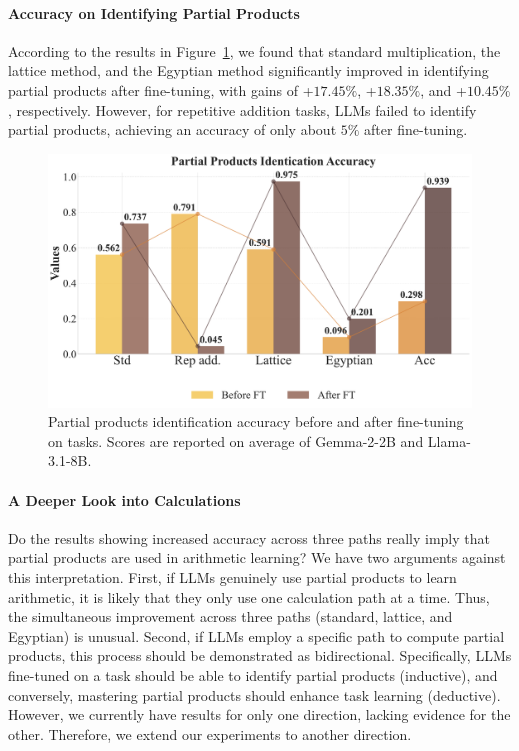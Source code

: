 \documentclass[11pt]{article}
\begin{document}
\paragraph{Accuracy on Identifying Partial Products}
According to the results in Figure~\ref{fig:partial_products}, we found that standard multiplication, the lattice method, and the Egyptian method significantly improved in identifying partial products after fine-tuning, with gains of +$17.45\%$, +$18.35\%$, and +$10.45\%$, respectively. However, for repetitive addition tasks, LLMs failed to identify partial products, achieving an accuracy of only about $5\%$ after fine-tuning.
\begin{figure}[ht]
    \centering
    \includegraphics[width=0.98\linewidth]{figure/metriC_comparison_new.pdf}
    \caption{Partial products identification accuracy before and after fine-tuning on tasks. Scores are reported on average of Gemma-2-2B and Llama-3.1-8B.}\label{fig:partial_products}
    \vspace{-0.4cm}
\end{figure}
\paragraph{A Deeper Look into Calculations}
Do the results showing increased accuracy across three paths really imply that partial products are used in arithmetic learning? We have two arguments against this interpretation. First, if LLMs genuinely use partial products to learn arithmetic, it is likely that they only use one calculation path at a time. Thus, the simultaneous improvement across three paths (standard, lattice, and Egyptian) is unusual. Second, if LLMs employ a specific path to compute partial products, this process should be demonstrated as bidirectional. Specifically, LLMs fine-tuned on a task should be able to identify partial products (inductive), and conversely, mastering partial products should enhance task learning (deductive). However, we currently have results for only one direction, lacking evidence for the other. Therefore, we extend our experiments to another direction.
\end{document}
